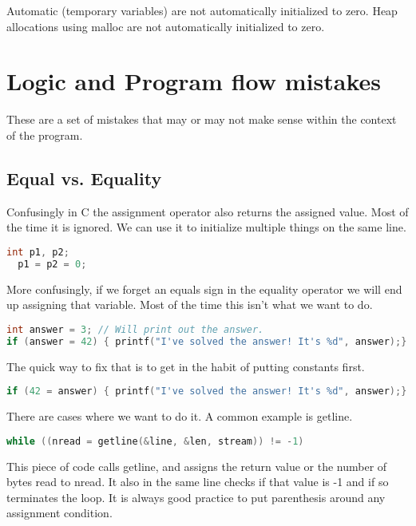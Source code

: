 Automatic (temporary variables) are not automatically initialized to zero.
Heap allocations using malloc are not automatically initialized to zero.

\section{Logic and Program flow mistakes}

These are a set of mistakes that may or may not make sense within the context of the program.

\subsection{Equal vs. Equality}

Confusingly in C the assignment operator also returns the assigned value. Most of the time it is ignored. We can use it to initialize multiple things on the same line.


\begin{lstlisting}[language=C]
  int p1, p2;
  p1 = p2 = 0;
\end{lstlisting}

More confusingly, if we forget an equals sign in the equality operator we will end up assigning that variable. Most of the time this isn't what we want to do.

\begin{lstlisting}[language=C]
int answer = 3; // Will print out the answer.
if (answer = 42) { printf("I've solved the answer! It's %d", answer);}
\end{lstlisting}

The quick way to fix that is to get in the habit of putting constants first.

\begin{lstlisting}[language=C]
if (42 = answer) { printf("I've solved the answer! It's %d", answer);}
\end{lstlisting}

There are cases where we want to do it. A common example is getline.

\begin{lstlisting}[language=C]
while ((nread = getline(&line, &len, stream)) != -1)
\end{lstlisting}

This piece of code calls getline, and assigns the return value or the number of bytes read to nread. It also in the same line checks if that value is -1 and if so terminates the loop.
It is always good practice to put parenthesis around any assignment condition.

